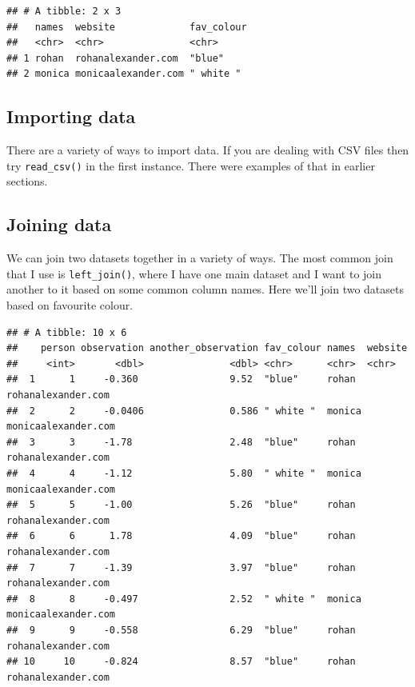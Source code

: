 \documentclass[
]{book}
\newenvironment{Shaded}{\begin{snugshade}}{\end{snugshade}}
\newcommand{\DataTypeTok}[1]{\textcolor[rgb]{0.13,0.29,0.53}{#1}}
\newcommand{\KeywordTok}[1]{\textcolor[rgb]{0.13,0.29,0.53}{\textbf{#1}}}
\newcommand{\NormalTok}[1]{#1}
\newcommand{\OperatorTok}[1]{\textcolor[rgb]{0.81,0.36,0.00}{\textbf{#1}}}
\newcommand{\StringTok}[1]{\textcolor[rgb]{0.31,0.60,0.02}{#1}}
\begin{document}
\begin{verbatim}
## # A tibble: 2 x 3
##   names  website             fav_colour
##   <chr>  <chr>               <chr>     
## 1 rohan  rohanalexander.com  "blue"    
## 2 monica monicaalexander.com " white "
\end{verbatim}

\hypertarget{importing-data}{%
\subsection{Importing data}\label{importing-data}}

There are a variety of ways to import data. If you are dealing with CSV files then try \texttt{read\_csv()} in the first instance. There were examples of that in earlier sections.

\hypertarget{joining-data}{%
\subsection{Joining data}\label{joining-data}}

We can join two datasets together in a variety of ways. The most common join that I use is \texttt{left\_join()}, where I have one main dataset and I want to join another to it based on some common column names. Here we'll join two datasets based on favourite colour.

\begin{Shaded}
\end{Shaded}

\begin{verbatim}
## # A tibble: 10 x 6
##    person observation another_observation fav_colour names  website            
##     <int>       <dbl>               <dbl> <chr>      <chr>  <chr>              
##  1      1     -0.360                9.52  "blue"     rohan  rohanalexander.com 
##  2      2     -0.0406               0.586 " white "  monica monicaalexander.com
##  3      3     -1.78                 2.48  "blue"     rohan  rohanalexander.com 
##  4      4     -1.12                 5.80  " white "  monica monicaalexander.com
##  5      5     -1.00                 5.26  "blue"     rohan  rohanalexander.com 
##  6      6      1.78                 4.09  "blue"     rohan  rohanalexander.com 
##  7      7     -1.39                 3.97  "blue"     rohan  rohanalexander.com 
##  8      8     -0.497                2.52  " white "  monica monicaalexander.com
##  9      9     -0.558                6.29  "blue"     rohan  rohanalexander.com 
## 10     10     -0.824                8.57  "blue"     rohan  rohanalexander.com
\end{verbatim}
\end{document}
